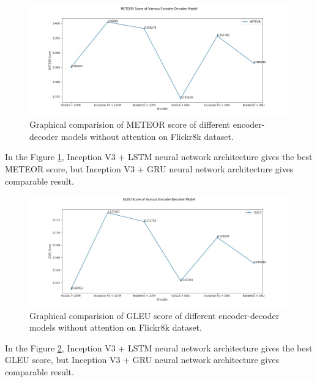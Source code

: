 \begin{figure}[ht!]
    \includegraphics[scale=0.5]{chapters/5/intfig/meteor_score.jpg}\hfill
    \caption{Graphical comparision of METEOR score of different encoder-decoder models without attention on Flickr8k dataset.}
    \label{img:graph_meteor}
\end{figure}
\newpage
\noindent In the Figure \ref{img:graph_meteor}, Inception V3 + LSTM neural network architecture gives the best METEOR score, but Inception V3 + GRU neural network architecture gives comparable result.

\begin{figure}[ht!]
    \includegraphics[scale=0.5]{chapters/5/intfig/gleu_score.jpg}\hfill
    \caption{Graphical comparision of GLEU score of different encoder-decoder models without attention on Flickr8k dataset.}
    \label{img:graph_gleu}
\end{figure}
\noindent In the Figure \ref{img:graph_gleu}, Inception V3 + LSTM neural network architecture gives the best GLEU score, but Inception V3 + GRU neural network architecture gives comparable result.

